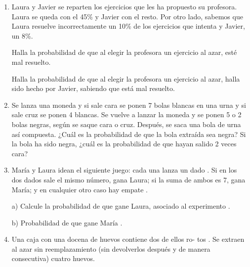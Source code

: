 \begin{adjustwidth}{5mm}{5mm}
\begin{enumerate}[PB. 1. ]
\hspace{-1cm}\vspace{1cm}

\item  Laura y Javier se reparten los ejercicios que les ha propuesto su profesora. Laura se queda con el 45\% y Javier con el resto. Por otro lado, sabemos que Laura resuelve incorrectamente un 10\% de los ejercicios que intenta y Javier, un 8\%.

Halla la probabilidad de que al elegir la profesora un ejercicio al azar, esté mal resuelto.

Halla la probabilidad de que al elegir la profesora un ejercicio al azar, halla sido hecho por Javier, sabiendo que está mal resuelto.

\hspace{-1cm}\vspace{1cm}

\item Se lanza una moneda y si sale cara se ponen 7 bolas blancas en una urna y si sale cruz se ponen 4 blancas. Se vuelve a lanzar la moneda y se ponen 5 o 2 bolas negras, según se saque cara o cruz. Después, se saca una bola de urna así compuesta. ¿Cuál es la probabilidad de que la bola extraída sea negra? Si la bola ha sido negra, ¿cuál es la probabilidad de que hayan salido 2 veces cara? 

\hspace{-1cm}\vspace{1cm}

\item María y Laura idean el siguiente juego: cada una lanza un dado . Si en los dos dados sale el mismo número, gana Laura; si la suma de ambos es 7, gana María; y en cualquier otro caso hay empate . 

a) Calcule la probabilidad de que gane Laura, asociado al experimento . 

b) Probabilidad de que gane María . 

\hspace{-1cm}\vspace{1cm}


\item Una caja con una docena de huevos contiene dos de ellos ro- tos . Se extraen al azar sin reemplazamiento (sin devolverlos después y de manera consecutiva) cuatro huevos. 


\end{enumerate}
\end{adjustwidth}
